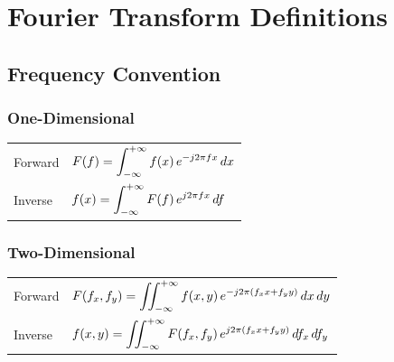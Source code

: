 %
%

\chapter{Fourier Transform Definitions}


\section{Frequency Convention}

\subsection*{One-Dimensional}

\begin{center}
\begin{tabular}{ll}
\toprule
Forward &
$\displaystyle
F(f)=
\int_{-\infty}^{+\infty}
f(x)\,
e^{-j2\pi fx}\,
dx
$
\\[0.6cm]

Inverse &
$\displaystyle
f(x)=
\int_{-\infty}^{+\infty}
F(f)\,
e^{j2\pi fx}\,
df
$
\\
\bottomrule
\end{tabular}
\end{center}


\subsection*{Two-Dimensional}

\begin{center}
\begin{tabular}{ll}
\toprule
Forward &
$\displaystyle
F(f_x,f_y)=
\iint_{-\infty}^{+\infty}
f(x,y)\,
e^{-j2\pi(f_x x+f_y y)}\,
dx\,dy
$
\\[0.6cm]

Inverse &
$\displaystyle
f(x,y)=
\iint_{-\infty}^{+\infty}
F(f_x,f_y)\,
e^{j2\pi(f_x x+f_y y)}\,
df_x\,df_y
$
\\
\bottomrule
\end{tabular}
\end{center}

